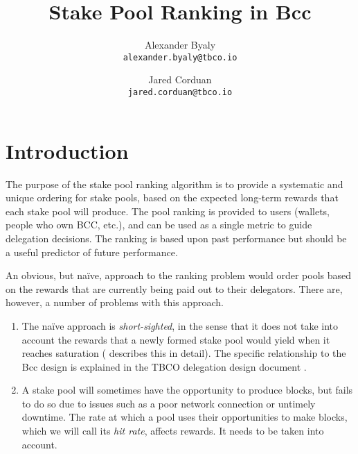 \documentclass[11pt,a4paper,dvipsnames,twosided]{article}
\begin{document}
\title{Stake Pool Ranking in Bcc}

\author{Alexander Byaly  \\ {\small \texttt{alexander.byaly@tbco.io}} \\
   \and Jared Corduan  \\ {\small \texttt{jared.corduan@tbco.io}}}



\setlength{\parindent}{0pt}
\setlength{\parskip}{12pt plus 3pt minus 2pt}

\maketitle

\section{Introduction}

The purpose of the stake pool ranking algorithm is to provide a systematic and unique ordering for stake pools,
based on the expected long-term rewards that each stake pool will produce.
The pool ranking is provided to users (wallets, people who own BCC, etc.), and can be used as a single
metric to guide delegation decisions.
The ranking is based upon past performance but should be a useful predictor of future performance.

An obvious, but na\"{i}ve, approach to the ranking problem would order pools based on the rewards that are
currently being paid out to their delegators.  There are, however, a number of problems with this approach.

\begin{enumerate}
  \item
    The na\"{i}ve approach is \emph{short-sighted}, in the sense that it does not take into
    account the rewards that a newly formed stake pool would yield when it reaches saturation (\cite{bkks2018} describes this in detail).
    The specific relationship to the Bcc design is explained in the TBCO delegation design document \cite[Section 5.6]{delegation_design}.
  \item
    A stake pool will sometimes have the opportunity to produce blocks,
    but fails to do so due to issues such as a poor network connection or untimely downtime. The rate at
    which a pool uses their opportunities to make blocks, which we will call its \emph{hit rate}, affects rewards.
    It needs to be taken into account.
\end{enumerate}
\end{document}
